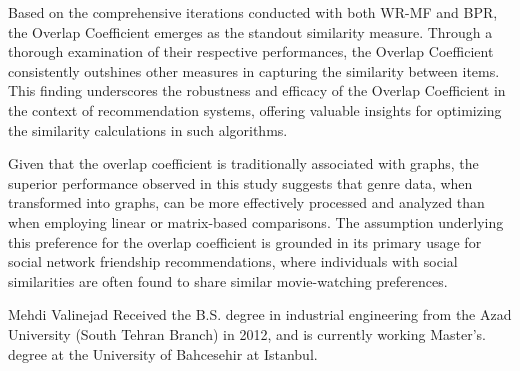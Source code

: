 \documentclass[journal]{IEEEtran}
\begin{document}
Based on the comprehensive iterations conducted with both WR-MF and BPR, the Overlap Coefficient emerges as the standout similarity 
measure. Through a thorough examination of their respective performances, the Overlap Coefficient consistently outshines other measures 
in capturing the similarity between items. This finding underscores the robustness and efficacy of the Overlap Coefficient in the 
context of recommendation systems, offering valuable insights for optimizing the similarity calculations in such algorithms.

Given that the overlap coefficient is traditionally associated with graphs, the superior performance observed in this study suggests 
that genre data, when transformed into graphs, can be more effectively processed and analyzed than when employing linear or 
matrix-based comparisons. The assumption underlying this preference for the overlap coefficient is grounded in its primary usage for 
social network friendship recommendations, where individuals with social similarities are often found to share similar movie-watching 
preferences.

\ifCLASSOPTIONcaptionsoff
  \newpage
\fi




\begin{IEEEbiographynophoto}{Mehdi Valinejad}
Received the B.S. degree in industrial engineering from the Azad University (South Tehran Branch) in 2012, and is currently working Master's. degree at the University of Bahcesehir at Istanbul.
\end{IEEEbiographynophoto}
\end{document}
